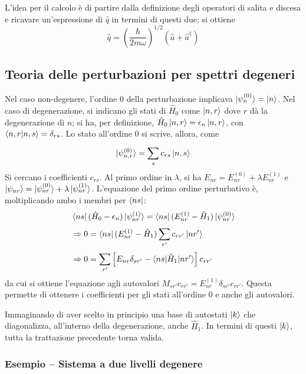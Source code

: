 \documentclass[11pt, a4paper]{scrartcl} %
\numberwithin{equation}{subsection}
\theoremstyle{style2}
\theoremstyle{style1}
\begin{document}
L'idea per il calcolo \`e di partire dalla definizione degli operatori di salita e discesa e ricavare un'espressione di $\hat{q}$ in termini di questi due; si ottiene 
\[
\hat{q} = \left(\frac{\hbar }{2m\omega}\right) ^{1/2} (\hat{a} + \hat{a}^\dagger )
\] 
\subsection{Teoria delle perturbazioni per spettri degeneri}

Nel caso non-degenere, l'ordine $0$ della perturbazione implicava $\ket{\psi_n^{(0)} }  = \ket{n} $.
Nel caso di degenerazione, si indicano gli stati di $\hat{H}_0$ come $\ket{n,r} $ dove $r$ d\`a la degenerazione di $n$; si ha, per definizione, $\hat{H}_0 \ket{n,r} = \epsilon _n \ket{n, r} $, con $\braket{n,r|n,s} = \delta _{rs} $.
Lo stato all'ordine $0$ si scrive, allora, come
\begin{equation}
	\ket{\psi ^{(0)} _{n,r} } =\sum_{s}^{} c_{rs} \ket{n,s} 
\end{equation}
Si cercano i coefficienti $c_{rs} $.
Al primo ordine in $\lambda $, si ha $E_{nr} = E^{(0)} _{nr} + \lambda E^{(1)} _{nr} $ e $\ket{\psi _{nr} } = \ket{\psi ^{(0)} _{nr} } + \lambda \ket{\psi ^{(1)} _{nr} } $. 
L'equazione del primo ordine perturbativo \`e, moltiplicando ambo i membri per $\bra{ns} $:
\[
	\begin{split}
		&\bra{ns} 	(\hat{H}_0 -\epsilon _n) \ket{\psi ^{(1)} _{nr} } = \bra{ns} ( E^{(1)} _{nr} - \hat{H}_1) \ket{\psi ^{(0)} _{nr} } \\
		&\Rightarrow 0 = \bra{ns} (E^{(1)} _{nr} - \hat{H}_1) \sum_{r'}^{} c_{rr'} \ket{nr'} \\
		&\Rightarrow  0 = \sum_{r'}^{} \left[ E_{nr} \delta _{sr'}  - \braket{ns|\hat{H}_1|nr'}  \right] c_{rr'} 
	\end{split}
\] 
da cui si ottiene l'equazione agli autovalori $M_{sr'} c_{rr'} =E_{nr} ^{(1)}  \delta _{sr'} c_{rr'} $.
Questa permette di ottenere i coefficienti per gli stati all'ordine $0$ e anche gli autovalori.

Immaginando di aver scelto in principio una base di autostati $\ket{k} $ che diagonalizza, all'interno della degenerazione, anche $\hat{H}_1$. 
In termini di questi $\ket{k} $, tutta la trattazione precedente torna valida.
\subsubsection{Esempio -- Sistema a due livelli degenere}
\end{document}
